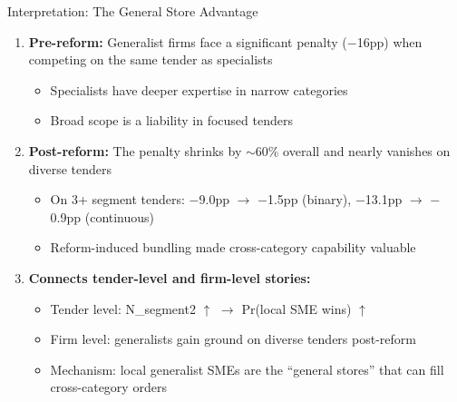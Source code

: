 \documentclass[9pt,aspectratio=169]{beamer}
\begin{document}
\begin{frame}{Interpretation: The General Store Advantage}
\begin{enumerate}
  \item \textbf{Pre-reform:} Generalist firms face a significant penalty ($-$16pp) when competing on the same tender as specialists
  \begin{itemize}
    \item Specialists have deeper expertise in narrow categories
    \item Broad scope is a liability in focused tenders
  \end{itemize}

  \bigskip
  \item \textbf{Post-reform:} The penalty shrinks by $\sim$60\% overall and nearly vanishes on diverse tenders
  \begin{itemize}
    \item On 3+ segment tenders: $-$9.0pp $\to$ $-$1.5pp (binary), $-$13.1pp $\to$ $-$0.9pp (continuous)
    \item Reform-induced bundling made cross-category capability valuable
  \end{itemize}

  \bigskip
  \item \textbf{Connects tender-level and firm-level stories:}
  \begin{itemize}
    \item Tender level: N\_segment2 $\uparrow$ $\to$ Pr(local SME wins) $\uparrow$
    \item Firm level: generalists gain ground on diverse tenders post-reform
    \item Mechanism: local generalist SMEs are the ``general stores'' that can fill cross-category orders
  \end{itemize}
\end{enumerate}
\end{frame}
\end{document}
